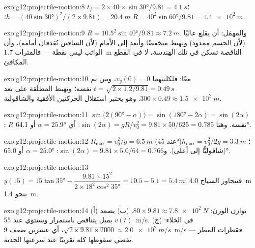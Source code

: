 \begin{solution}{exo:g12:projectile-motion:8}
$t_f = 2 \times 40 \times \sin\ang{30}/9.81 = \qty{4.1}{s}$؛
$h = (40\sin\ang{30})^2/(2 \times 9.81) = \qty{20.4}{m}$؛
$R = 40^2 \sin\ang{60}/9.81 = \qty{1.4e2}{m}$.
\end{solution}

\begin{solution}{exo:g12:projectile-motion:9}
$R = 10.5^2\sin\ang{40}/9.81 \approx \qty{7.2}{m}$. والمهمَل: أن
 يقلع عاليًا (لأن الجسم ممدود) ويهبط منخفضًا وأبعد
إلى الأمام (لأن الساقين تُقذفان أمامه)، وأن الواثب ليس نقطة ---
فالمترات \qty{1.7}{m} الناقصة تسكن في تلك الهندسة، لا في القطع المكافئ.
\end{solution}

\begin{solution}{exo:g12:projectile-motion:10}
معًا: فلكلتيهما $v_y(0) = 0$، ومن ثم $t = \sqrt{2 \times 1.2/9.81} = \qty{0.49}{s}$ نفسه؛
وتهبط المطلَقة على بعد
$300 \times 0.49 \approx \qty{1.5e2}{m}$. وهو يختبر
استقلال الحركتين الأفقية والشاقولية.
\end{solution}

\begin{solution}{exo:g12:projectile-motion:11}
$\sin\bigl(2(\ang{90}-\alpha)\bigr) = \sin(\ang{180}-2\alpha) =
\sin(2\alpha)$:  $R$ نفسه. وهنا $\sin(2\alpha) = gR/v_0^2 =
9.81 \times 50/625 = 0.785$: أي $\alpha = \ang{25.9}$ أو \ang{64.1}.
\end{solution}

\begin{solution}{exo:g12:projectile-motion:12}
$R_{\max} = v_0^2/g = \qty{6.5}{m}$ (عند \ang{45})؛
$h_{\max} = v_0^2/2g = \qty{3.3}{m}$ (شاقوليًّا إلى أعلى).
و$\sin(2\alpha) = 9.81 \times 5.0/64 = 0.766$: $\alpha = \ang{25.0}$
أو \ang{65.0}.
\end{solution}

\begin{solution}{exo:g12:projectile-motion:13}
$y(15) = 15\tan\ang{35} - \dfrac{9.81 \times 15^2}
{2 \times 18^2 \cos^2\ang{35}} = 10.5 - 5.1 = \qty{5.4}{m}$:
فتتجاوز السياج \qty{4.0}{m} بنحو \qty{1.4}{m}.
\end{solution}

\begin{solution}{exo:g12:projectile-motion:14}
(أ) توازن  الوزنَ: $80 \times 9.81 \approx \qty{7.8e2}{N}$.
(ب) يصعد $v(t)$ بميل يتناقص باستمرار ويستوي عند
\qty{55}{m/s}. (ج) في الخلاء:
$\sqrt{2 \times 9.81 \times 2000} \approx \qty{2.0e2}{m/s}$، أي عشرين
ضعف   \qty{9}{m/s} --- فقطرات المطر تقضي سقوطها
كله تقريبًا عند سرعتها الحدية.
\end{solution}

